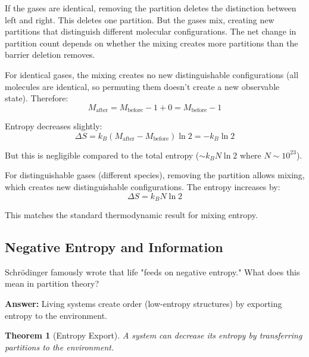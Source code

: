 \documentclass[twocolumn,10pt]{article}
\newtheorem{theorem}{Theorem}[section]
\theoremstyle{definition}
\theoremstyle{remark}
\begin{document}
If the gases are identical, removing the partition deletes the distinction between left and right. This deletes one partition. But the gases mix, creating new partitions that distinguish different molecular configurations. The net change in partition count depends on whether the mixing creates more partitions than the barrier deletion removes.

For identical gases, the mixing creates no new distinguishable configurations (all molecules are identical, so permuting them doesn't create a new observable state). Therefore:
\begin{equation}
M_{\text{after}} = M_{\text{before}} - 1 + 0 = M_{\text{before}} - 1
\end{equation}

Entropy decreases slightly:
\begin{equation}
\Delta S = k_B (M_{\text{after}} - M_{\text{before}}) \ln 2 = -k_B \ln 2
\end{equation}

But this is negligible compared to the total entropy ($\sim k_B N \ln 2$ where $N \sim 10^{23}$).

\vspace{0.2cm}
\noindent For distinguishable gases (different species), removing the partition allows mixing, which creates new distinguishable configurations. The entropy increases by:
\begin{equation}
\Delta S = k_B N \ln 2
\end{equation}

This matches the standard thermodynamic result for mixing entropy.

\subsection{Negative Entropy and Information}

Schrödinger\cite{schrodinger1944} famously wrote that life "feeds on negative entropy." What does this mean in partition theory?

\vspace{0.2cm}
\noindent\textbf{Answer:} Living systems create order (low-entropy structures) by exporting entropy to the environment.

\begin{theorem}[Entropy Export]
\label{thm:entropy_export}
A system can decrease its entropy by transferring partitions to the environment.
\end{theorem}
\end{document}
